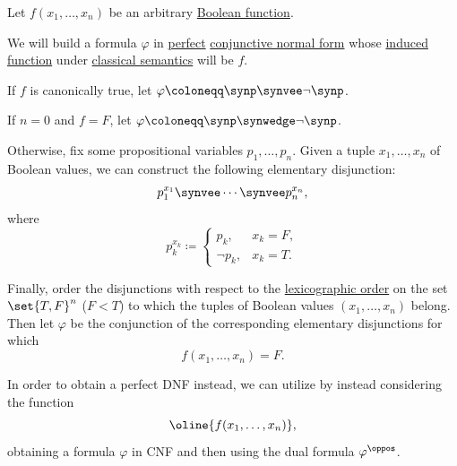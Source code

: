 \begin{algorithm}\label{alg:full_cnf_and_dnf}
  Let \( f(x_1, \ldots, x_n) \) be an arbitrary \hyperref[def:boolean_function]{Boolean function}.

  We will build a formula \( \varphi \) in \hyperref[def:full_cnf_and_dnf]{perfect} \hyperref[def:cnf_and_dnf]{conjunctive normal form} whose \hyperref[def:parametrized_propositional_denotation]{induced function} under \hyperref[def:truth_value_algebra/classical]{classical semantics} will be \( f \).

  \begin{thmenum}
     If \( f \) is canonically true, let \( \varphi \coloneqq \synp \synvee \neg \synp \).

     If \( n = 0 \) and \( f = F \), let \( \varphi \coloneqq \synp \synwedge \neg \synp \).

     Otherwise, fix some propositional variables \( p_1, \ldots, p_n \). Given a tuple \( x_1, \ldots, x_n \) of Boolean values, we can construct the following elementary disjunction:
    \begin{equation}\label{alg:full_cnf_and_dnf/cnf}
      p_1^{x_1} \synvee \cdots \synvee p_n^{x_n},
    \end{equation}
    where
    \begin{equation*}
      p_k^{x_k} \coloneqq \begin{cases}
        p_k,      &x_k = F, \\
        \neg p_k, &x_k = T.
      \end{cases}
    \end{equation*}

     Finally, order the disjunctions with respect to the \hyperref[def:lexicographic_order]{lexicographic order} on the set \( \set{ T, F }^n \) (\( F < T \)) to which the tuples of Boolean values \( (x_1, \ldots, x_n) \) belong. Then let \( \varphi \) be the conjunction of the corresponding elementary disjunctions for which
    \begin{equation*}
      f(x_1, \ldots, x_n) = F.
    \end{equation*}

     In order to obtain a perfect DNF instead, we can utilize  by instead considering the function
    \begin{equation*}
      \oline{f(x_1, \ldots, x_n)},
    \end{equation*}
    obtaining a formula \( \varphi \) in CNF and then using the dual formula \( \varphi^\oppos \).
  \end{thmenum}
\end{algorithm}

